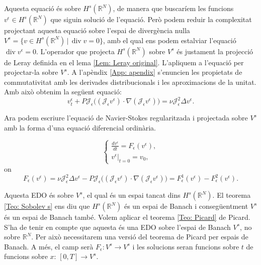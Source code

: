 \documentclass{article}
\numberwithin{equation}{section}
\DeclareMathOperator{\diver}{div}
\begin{document}
Aquesta equaci\'{o} \'{e}s sobre $H^s(\mathbb{R}^N)$, de manera que buscar\'{i}em les funcions $v^{\epsilon}\in H^s(\mathbb{R}^N)$ que siguin soluci\'{o} de l'equaci\'{o}. Per\`{o} podem reduir la complexitat projectant aquesta equaci\'{o} sobre l'espai de diverg\`{e}ncia nul\textperiodcentered la $V^s=\{v\in H^s(\mathbb{R}^N)\,|\,\diver v=0\}$, amb el qual ens podem estalviar l'equaci\'{o} $\diver v^{\epsilon}=0$. L'operador que projecta $H^s(\mathbb{R}^N)$ sobre $V^s$ \'{e}s justament la projecci\'{o} de Leray definida en el lema \ref{Lem: Leray original}. L'apliquem a l'equaci\'{o} per projectar-la sobre $V^s$. A l'ap\`{e}ndix \ref{App: apendix} s'enuncien les propietats de commutativitat amb les derivades distribucionals i les aproximacions de la unitat. Amb aix\`{o} obtenim la seg\"{u}ent equaci\'{o}:
\begin{equation}\label{Equ. Navier-Stokes projectada}
v_t^{\epsilon}+P\mathcal{J}_{\epsilon}\big((\mathcal{J}_{\epsilon}v^{\epsilon})\cdot\nabla(\mathcal{J}_{\epsilon}v^{\epsilon})\big)=\nu\mathcal{J}_{\epsilon}^2\Delta v^{\epsilon}.
\end{equation}

Ara podem escriure l'equaci\'{o} de Navier-Stokes regularitzada i projectada sobre $V^s$ amb la forma d'una equaci\'{o} diferencial ordin\`{a}ria.

\begin{equation}\label{Equ. EDO projectada}
\left\{\begin{array}{l}\displaystyle{\frac{dv^{\epsilon}}{dt}=F_{\epsilon}(v^{\epsilon})},\\v^{\epsilon}|_{t=0}=v_0,\end{array}\right.
\end{equation}
on
\begin{equation}
F_{\epsilon}(v^{\epsilon})=\nu\mathcal{J}_{\epsilon}^2\Delta v^{\epsilon}-P\mathcal{J}_{\epsilon}\big((\mathcal{J}_{\epsilon}v^{\epsilon})\cdot\nabla(\mathcal{J}_{\epsilon}v^{\epsilon})\big)=F_{\epsilon}^1(v^{\epsilon})-F_{\epsilon}^2(v^{\epsilon}).
\end{equation}

Aquesta EDO \'{e}s sobre $V^s$, el qual \'{e}s un espai tancat dins $H^s(\mathbb{R}^N)$. El teorema \ref{Teo: Sobolev s} ens diu que $H^s(\mathbb{R}^N)$ \'{e}s un espai de Banach i conseg\"{u}entment $V^s$ \'{e}s un espai de Banach tamb\'{e}. Volem aplicar el teorema \ref{Teo: Picard} de Picard. S'ha de tenir en compte que aquesta \'{e}s una EDO sobre l'espai de Banach $V^s$, no sobre $\mathbb{R}^N$. Per aix\`{o} necessitarem una versi\'{o} del teorema de Picard per espais de Banach. A m\'{e}s, el camp ser\`{a} $F_{\epsilon}:V^s\rightarrow V^s$ i les solucions seran funcions sobre $t$ de funcions sobre $x$: $[0,T]\rightarrow V^s$.
\end{document}

